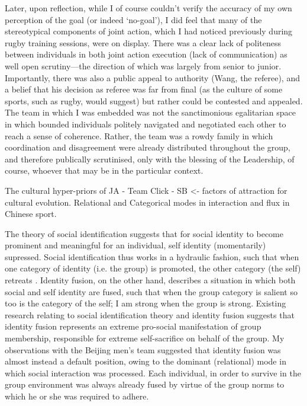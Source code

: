 \begin{CJK}{UTF8}{gbsn}
  Later, upon reflection, while I of course couldn't verify the accuracy of my own perception of the goal (or indeed `no-goal'), I did feel that many of the stereotypical components of joint action, which I had noticed previously during rugby training sessions, were on display.  There was a clear lack of politeness between individuals in both joint action execution (lack of communication) as well open scrutiny---the direction of which was largely from senior to junior.  Importantly, there was also a public appeal to authority (Wang, the referee), and a belief that his decision as referee was far from final (as the culture of some sports, such as rugby, would suggest) but rather could be contested and appealed.  The team in which I was embedded was not the sanctimonious egalitarian space in which bounded individuals politely navigated and negotiated each other to reach a sense of coherence.  Rather, the team was a rowdy family in which coordination and disagreement were already distributed throughout the group, and therefore publically scrutinised, only with the blessing of the Leadership, of course, whoever that may be in the particular context.







  The cultural hyper-priors of JA - Team Click - SB <- factors of attraction for cultural evolution.
  Relational and Categorical modes in interaction and flux in Chinese sport.

  The theory of social identification suggests that for social identity to become prominent and meaningful for an individual, self identity (momentarily) supressed.  Social identification thus works in a hydraulic fashion, such that when one category of identity (i.e. the group) is promoted, the other category (the self) retreats \citep{Swann2009}.  Identity fusion, on the other hand, describes a situation in which both social and self identity are fused, such that when the group category is salient so too is the category of the self; I am strong when the group is strong.  Existing research relating to social identification theory and identity fusion suggests that identity fusion represents an extreme pro-social manifestation of group membership, responsible for extreme self-sacrifice on behalf of the group.  My observations with the Beijing men's team suggested that identity fusion was almost instead a default position, owing to the dominant (relational) mode in which social interaction was processed.  Each individual, in order to survive in the group environment was always already fused by virtue of the group norms to which he or she was required to adhere.


\end{CJK}

